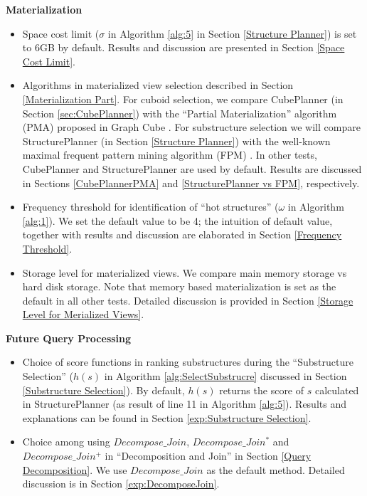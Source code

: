 \textbf{Materialization}
\begin{itemize}
	
	\item  Space cost limit ($\sigma$ in Algorithm \ref{alg:5} in Section \ref{Structure Planner}) is set to 6GB by default. Results and discussion are presented in Section \ref{Space Cost Limit}.
	
	\item  Algorithms in materialized view selection described in Section \ref{Materialization Part}. For cuboid selection, we compare CubePlanner (in Section \ref{sec:CubePlanner}) with the ``Partial Materialization'' algorithm (PMA) proposed in Graph Cube \cite{DBLP:conf/sigmod/ZhaoLXH11}. For substructure selection we will compare StructurePlanner (in Section \ref{Structure Planner}) with the well-known maximal frequent pattern mining algorithm (FPM) \cite{DBLP:conf/dmkdttt/DewsnipM01}. In other tests, CubePlanner and StructurePlanner are used by default. Results are discussed in Sections \ref{CubePlannerPMA} and \ref{StructurePlanner vs FPM}, respectively.
	
	\item Frequency threshold for identification of “hot structures” ($\omega$ in Algorithm \ref{alg:1}). We set the default value to be 4; the intuition of default value, together with results and discussion are elaborated in Section \ref{Frequency Threshold}.
	
	\item Storage level for materialized views. We  compare main memory storage vs hard disk storage. Note that memory based materialization is set as the default in all other tests. Detailed discussion is provided in Section \ref{Storage Level for Merialized Views}.
	
\end{itemize}

\textbf{Future Query Processing}
\begin{itemize}
	\item  Choice of score functions in ranking substructures during the  ``Substructure Selection'' ($h(s)$ in Algorithm \ref{alg:SelectSubstrucre} discussed in Section \ref{Substructure Selection}). By default, $h(s)$ returns the score of $s$ calculated in StructurePlanner (as result of line 11 in Algorithm \ref{alg:5}). Results and explanations can be found in Section \ref{exp:Substructure Selection}.
	
	\item  Choice among using $Decompose\_Join$, $Decompose\_Join^{*}$ and $Decompose\_Join^{+}$ in ``Decomposition and Join'' in Section \ref{Query Decomposition}. We use $Decompose\_Join$ as the default method. Detailed discussion is in Section \ref{exp:DecomposeJoin}.
	
\end{itemize}

